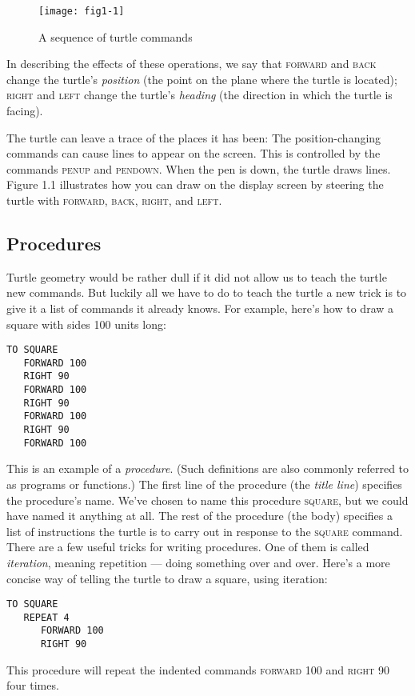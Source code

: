 \documentclass{book}
\begin{document}
\begin{figure}
\begin{center}
\texttt{[image: fig1-1]}
\caption{A sequence of turtle commands}
\end{center}
\end{figure}

In describing the effects of these operations, we say that \textsc{forward} and \textsc{back} change the turtle's {\em position} (the point on the plane where the turtle is located); \textsc{right} and \textsc{left} change the turtle's {\em heading} (the direction in which the turtle is facing). 

The turtle can leave a trace of the places it has been: The position-changing commands can cause lines to appear on the screen. This is controlled by the commands \textsc{penup} and \textsc{pendown}. When the pen is down, the turtle draws lines. Figure 1.1 illustrates how you can draw on the display screen by steering the turtle with \textsc{forward}, \textsc{back}, \textsc{right}, and \textsc{left}.

\subsection{Procedures}
Turtle geometry would be rather dull if it did not allow us to teach the
turtle new commands. But luckily all we have to do to teach the turtle a
new trick is to give it a list of commands it already knows. For example,
here's how to draw a square with sides 100 units long:
\begin{verbatim}
TO SQUARE
   FORWARD 100
   RIGHT 90
   FORWARD 100
   RIGHT 90
   FORWARD 100
   RIGHT 90
   FORWARD 100
\end{verbatim}
This is an example of a {\em procedure}. (Such definitions are also commonly referred to as programs or functions.) The first line of the procedure (the {\em title line}) specifies the procedure's name. We've chosen to name this procedure \textsc{square}, but we could have named it anything at all. The rest of the procedure (the body) specifies a list of instructions the turtle is to carry out in response to the \textsc{square} command. There are a few useful tricks for writing procedures. One of them is called {\em iteration}, meaning repetition --- doing something over and over. Here's a more concise way of telling the turtle to draw a square, using iteration:

\begin{verbatim}
TO SQUARE
   REPEAT 4
      FORWARD 100
      RIGHT 90
\end{verbatim}
This procedure will repeat the indented commands \textsc{forward} 100 and \textsc{right} 90 four times.
\end{document}
